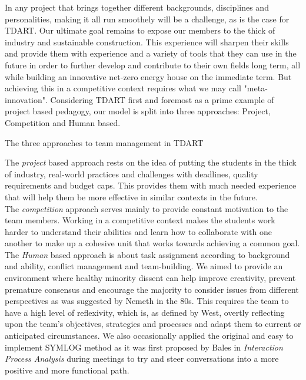 \documentclass[justified]{tufte-book}
\begin{document}
	In any project that brings together different backgrounds, disciplines and personalities, making it all run smoothely will be a challenge, as is the case for TDART. Our ultimate goal remains to expose our members to the thick of industry and sustainable construction. This experience will sharpen their skills and provide them with experience and a variety of tools that they can use in the future in order to further develop and contribute to their own fields long term, all while building an innovative net-zero energy house on the immediate term. But achieving this in a competitive context requires what we may call "meta-innovation". Considering TDART first and foremost as a prime example of project based pedagogy, our model is split into three approaches: Project, Competition and Human based\cite{jabdessadak2019}.
	\begin{marginfigure}
\caption{The three approaches to team management in TDART}
\end{marginfigure}
	The \textit{project} based approach rests on the idea of putting the students in the thick of industry, real-world practices and challenges with deadlines, quality requirements and budget caps. This provides them with much needed experience that will help them be more effective in similar contexts in the future.\\
	The \textit{competition} approach serves mainly to provide constant motivation to the team members. Working in a competitive context makes the students work harder to understand their abilities and learn how to collaborate with one another to make up a cohesive unit that works towards achieving a common goal.\\
	The \textit{Human} based approach is about task assignment according to background and ability, conflict management and team-building. We aimed to provide an environment where healthy minority dissent can help improve creativity, prevent premature consensus and encourage the majority to consider issues from different perspectives as was suggested by Nemeth\cite{nemeth1986differential} in the 80s. This requires the team to have a high level of reflexivity, which is, as defined by West\cite{west1996reflexivity}, overtly reflecting upon the team's objectives, strategies and processes and adapt them to current or anticipated circumstances. We also occasionally applied the original and easy to implement SYMLOG method as it was first proposed by Bales in \textit{Interaction Process Analysis}\cite{bales1950interaction} during meetings to try and steer conversations into a more positive and more functional path.
	
	
	
	
\end{document}
